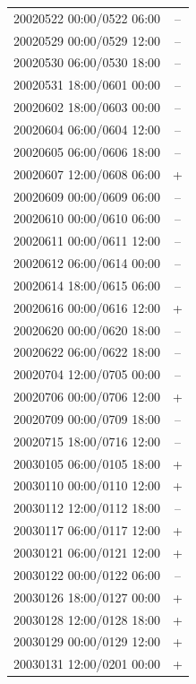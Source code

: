 \documentclass[linenumbers,draft]{agujournal}
\begin{document}
\begin{center}
\begin{longtable}{lc}
20020522 00:00/0522 06:00 & -- \\
20020529 00:00/0529 12:00 & -- \\
20020530 06:00/0530 18:00 & -- \\
20020531 18:00/0601 00:00 & -- \\
20020602 18:00/0603 00:00 & -- \\
20020604 06:00/0604 12:00 & -- \\
20020605 06:00/0606 18:00 & -- \\
20020607 12:00/0608 06:00 & + \\
20020609 00:00/0609 06:00 & -- \\
20020610 00:00/0610 06:00 & -- \\
20020611 00:00/0611 12:00 & -- \\
20020612 06:00/0614 00:00 & -- \\
20020614 18:00/0615 06:00 & -- \\
20020616 00:00/0616 12:00 & + \\
20020620 00:00/0620 18:00 & -- \\
20020622 06:00/0622 18:00 & -- \\
20020704 12:00/0705 00:00 & -- \\
20020706 00:00/0706 12:00 & + \\
20020709 00:00/0709 18:00 & -- \\
20020715 18:00/0716 12:00 & -- \\
20030105 06:00/0105 18:00 & + \\
20030110 00:00/0110 12:00 & + \\
20030112 12:00/0112 18:00 & -- \\
20030117 06:00/0117 12:00 & + \\
20030121 06:00/0121 12:00 & + \\
20030122 00:00/0122 06:00 & -- \\
20030126 18:00/0127 00:00 & + \\
20030128 12:00/0128 18:00 & + \\
20030129 00:00/0129 12:00 & + \\
20030131 12:00/0201 00:00 & + \\
\hline
\end{longtable}
\end{center}

\pagebreak
\end{document}
